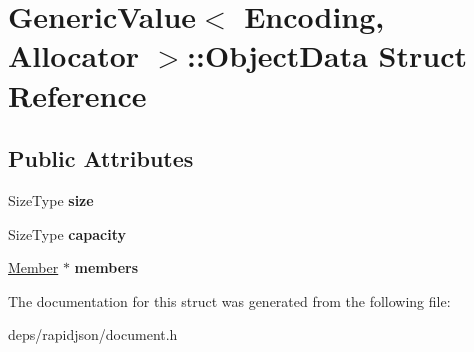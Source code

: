 \hypertarget{struct_generic_value_1_1_object_data}{}\section{Generic\+Value$<$ Encoding, Allocator $>$\+:\+:Object\+Data Struct Reference}
\label{struct_generic_value_1_1_object_data}
\subsection*{Public Attributes}
\begin{DoxyCompactItemize}
\item 
Size\+Type {\bfseries size}\hypertarget{struct_generic_value_1_1_object_data_a8aa09c430b245b9bb0745a1ab38201d5}{}\label{struct_generic_value_1_1_object_data_a8aa09c430b245b9bb0745a1ab38201d5}

\item 
Size\+Type {\bfseries capacity}\hypertarget{struct_generic_value_1_1_object_data_a22b8d8b01d52db71471f0d4c990cb93b}{}\label{struct_generic_value_1_1_object_data_a22b8d8b01d52db71471f0d4c990cb93b}

\item 
\hyperlink{class_generic_value_a7ccf27c44058b4c11c3efc6473afb886}{Member} $\ast$ {\bfseries members}\hypertarget{struct_generic_value_1_1_object_data_aea7075a9d2ca70b4e015e562e823c3b3}{}\label{struct_generic_value_1_1_object_data_aea7075a9d2ca70b4e015e562e823c3b3}

\end{DoxyCompactItemize}


The documentation for this struct was generated from the following file\+:\begin{DoxyCompactItemize}
\item 
deps/rapidjson/document.\+h\end{DoxyCompactItemize}
